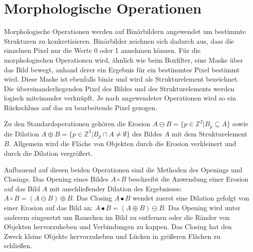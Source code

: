 \section{Morphologische Operationen}
Morphologische Operationen werden auf Bin\"arbildern angewendet um bestimmte Strukturen zu konkretisieren. Bin\"arbilder zeichnen sich dadurch aus, dass die einzelnen Pixel nur die Werte 0 oder 1 annehmen k\"onnen. F\"ur die morphologischen Operationen wird, \"ahnlich wie beim Boxfilter, eine Maske \"uber das Bild bewegt, anhand derer ein Ergebnis f\"ur ein bestimmtes Pixel bestimmt wird. Diese Maske ist ebenfalls bin\"ar und wird als Strukturelement bezeichnet. Die \"ubereinanderliegenden Pixel des Bildes und des Strukturelements werden logisch miteinander verkn\"upft. Je nach angewendeter Operationen wird so ein R\"uckschluss auf das zu bearbeitende Pixel gezogen.

Zu den Standardoperationen geh\"oren die Erosion \( A \ominus B = \{ p \in  \mathbb{Z}^2 | B_p \subseteq A  \} \)  sowie die Dilation \( A \oplus B = \{ p \in \mathbb{Z}^2 | B_p \cap A \neq \emptyset \} \) des Bildes \(A\) mit dem Strukturelement \(B \). Allgemein wird die Fl\"ache von Objekten durch die Erosion verkleinert und durch die Dilation vergr\"o\ss{}ert. 

Aufbauend auf diesen beiden Operationen sind die Methoden des Openings und Closings. Das Opening eines Bildes \( A \circ B\) beschreibt die Anwendung einer Erosion auf das Bild \(A\) mit anschlie\ss{}ender Dilation des Ergebnisses:  \( A \circ B = (A \ominus B) \oplus B \). Das Closing \( A \bullet B \) wendet zuerst eine Dilation gefolgt von einer Erosion auf das Bild an: \( A \bullet B = (A \oplus B) \ominus B \). Das Opening wird unter anderem eingesetzt um Rauschen im Bild zu entfernen oder die R\"ander von Objekten hervorzuheben und Verbindungen zu kappen. Das Closing hat den Zweck kleine Objekte hervorzuheben und L\"ucken in gr\"o\ss{}eren Fl\"achen zu schlie\ss{}en.

